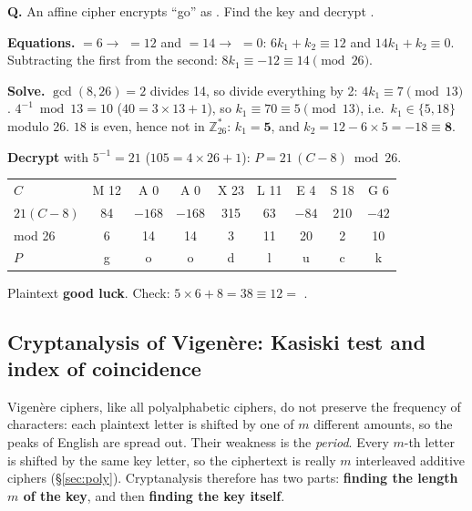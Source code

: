\begin{worked}
\textbf{Q.} An affine cipher encrypts ``go'' as . Find the key and decrypt .

\textbf{Equations.}  $= 6 \to$  $= 12$ and  $= 14 \to$  $= 0$: $6k_1 + k_2 \equiv 12$ and $14k_1 + k_2 \equiv 0$. Subtracting the first from the second: $8k_1 \equiv -12 \equiv 14 \pmod{26}$.

\textbf{Solve.} $\gcd(8, 26) = 2$ divides 14, so divide everything by 2: $4k_1 \equiv 7 \pmod{13}$. $4^{-1} \bmod 13 = 10$ ($40 = 3 \times 13 + 1$), so $k_1 \equiv 70 \equiv 5 \pmod{13}$, i.e.\ $k_1 \in \{5, 18\}$ modulo 26. $18$ is even, hence not in $\mathbb{Z}_{26}^*$: $k_1 = \mathbf{5}$, and $k_2 = 12 - 6 \times 5 = -18 \equiv \mathbf{8}$.

\textbf{Decrypt} with $5^{-1} = 21$ ($105 = 4 \times 26 + 1$): $P = 21\,(C - 8) \bmod 26$.
\begin{center}\small
\begin{tabular}{@{}l*{8}{c}@{}}
\toprule
$C$ & M 12 & A 0 & A 0 & X 23 & L 11 & E 4 & S 18 & G 6\\
$21(C - 8)$ & 84 & $-168$ & $-168$ & 315 & 63 & $-84$ & 210 & $-42$\\
mod 26 & 6 & 14 & 14 & 3 & 11 & 20 & 2 & 10\\
$P$ & g & o & o & d & l & u & c & k\\
\bottomrule
\end{tabular}
\end{center}
Plaintext \textbf{good luck}. Check: $5 \times 6 + 8 = 38 \equiv 12 = $  \checkmark.
\end{worked}

\subsection{Cryptanalysis of Vigen\`ere: Kasiski test and index of coincidence}
Vigen\`ere ciphers, like all polyalphabetic ciphers, do not preserve the frequency of characters: each plaintext letter is shifted by one of $m$ different amounts, so the peaks of English are spread out. Their weakness is the \emph{period}. Every $m$-th letter is shifted by the same key letter, so the ciphertext is really $m$ interleaved additive ciphers (\S\ref{sec:poly}). Cryptanalysis therefore has two parts: \textbf{finding the length $m$ of the key}, and then \textbf{finding the key itself}.

